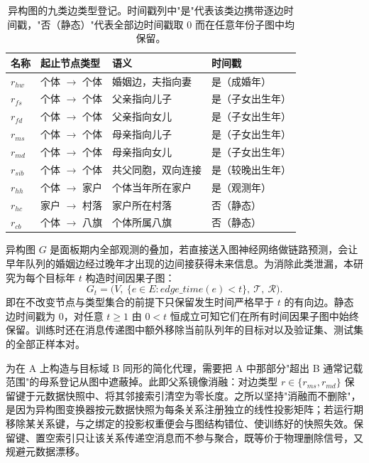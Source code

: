 \begin{table}[h]
\centering
\caption{异构图的九类边类型登记。时间戳列中"是"代表该类边携带逐边时间戳，"否（静态）"代表全部边时间戳取 0 而在任意年份子图中均保留。}
\label{tab:edge-types}
\begin{tabular}{llll}
\hline
名称 & 起止节点类型 & 语义 & 时间戳 \\
\hline
$r_{hw}$ & 个体 $\to$ 个体 & 婚姻边，夫指向妻 & 是（成婚年） \\
$r_{fs}$ & 个体 $\to$ 个体 & 父亲指向儿子 & 是（子女出生年） \\
$r_{fd}$ & 个体 $\to$ 个体 & 父亲指向女儿 & 是（子女出生年） \\
$r_{ms}$ & 个体 $\to$ 个体 & 母亲指向儿子 & 是（子女出生年） \\
$r_{md}$ & 个体 $\to$ 个体 & 母亲指向女儿 & 是（子女出生年） \\
$r_{sib}$ & 个体 $\to$ 个体 & 共父同胞，双向连接 & 是（较晚出生年） \\
$r_{hh}$ & 个体 $\to$ 家户 & 个体当年所在家户 & 是（观测年） \\
$r_{hc}$ & 家户 $\to$ 村落 & 家户所在村落 & 否（静态） \\
$r_{cb}$ & 个体 $\to$ 八旗 & 个体所属八旗 & 否（静态） \\
\hline
\end{tabular}
\end{table}

异构图 \(G\) 是面板期内全部观测的叠加，若直接送入图神经网络做链路预测，会让早年队列的婚姻边经过晚年才出现的边间接获得未来信息。为消除此类泄漏，本研究为每个目标年 \(t\) 构造时间因果子图：
\begin{equation}
G_t = \bigl(V,\ \{e\in E : \mathit{edge\_time}(e) < t\},\ \mathcal{T},\ \mathcal{R}\bigr).
\label{eq:subgraph}
\end{equation}
即在不改变节点与类型集合的前提下只保留发生时间严格早于 \(t\) 的有向边。静态边时间戳为 0，对任意 \(t\ge 1\) 由 \(0<t\) 恒成立可知它们在所有时间因果子图中始终保留。训练时还在消息传递图中额外移除当前队列年的目标对以及验证集、测试集的全部正样本对。

为在 A 上构造与目标域 B 同形的简化代理，需要把 A 中那部分"超出 B 通常记载范围"的母系登记从图中遮蔽掉。此即父系镜像消融：对边类型 \(r\in\{r_{ms},r_{md}\}\) 保留键于元数据快照中、将其邻接索引清空为零长度。之所以坚持"消融而不删除"，是因为异构图变换器按元数据快照为每条关系注册独立的线性投影矩阵\citep{hu2020hgt}；若运行期移除某关系键，与之绑定的投影权重便会与图结构错位、使训练好的快照失效。保留键、置空索引只让该关系传递空消息而不参与聚合，既等价于物理删除信号，又规避元数据漂移。

